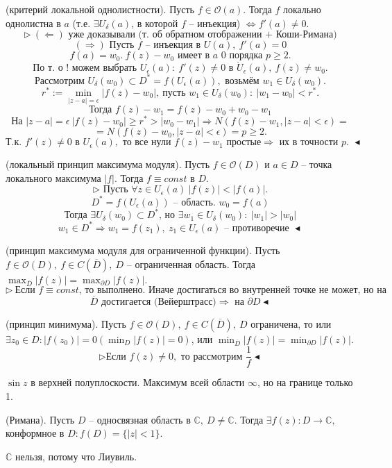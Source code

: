  (критерий локальной однолистности). Пусть $f \in \mathcal{O}(a).$ Тогда $f$ локально однолистна в $a$ (т.е. $\exists U_\delta(a)$, в которой $f$ -- инъекция) $\Leftrightarrow f'(a) \neq 0.$
\[\triangleright \ (\Leftarrow) \text{ уже доказывали (т. об обратном отображении + Коши-Римана)}\]
\[(\Rightarrow) \text{ Пусть $f$ -- инъекция в } U(a), \ f'(a) = 0\]
\[f(a) = w_0. \ f(z) - w_0 \text{ имеет в $a$ 0 порядка $p \geq 2$.}\]
\[\text{По т. о ! можем выбрать } U_\epsilon(a): \ f'(z) \neq 0 \text{ в } \mathring{U}_\epsilon(a), \ f(z) \neq w_0.\]
\[\text{Рассмотрим } U_\delta(w_0) \subset D^* = f(U_\epsilon(a)), \text{ возьмём } w_1 \in U_\delta(w_0).\]
\[r^* := \min_{|z-a|=\epsilon} |f(z) - w_0|, \ \text{пусть } w_1 \in U_\delta(w_0) : \ |w_1-w_0|<r^*.\]
\[\text{Тогда } f(z) - w_1 = f(z) - w_0 + w_0 - w_1\]
\[\text{На } |z-a|=\epsilon \ |f(z) - w_0|\geq r^* > |w_0-w_1| \Rightarrow N(f(z)-w_1, |z-a|<\epsilon) =\] 
\[=N(f(z)-w_0, |z-a|<\epsilon) = p \geq 2.\]
\[\text{Т.к. } f'(z)\neq 0 \text{ в } U_\epsilon(a), \text{ то все нули $f(z) - w_1$ простые} \Rightarrow \text{ их в точности $p$. } \blacktriangleleft\]

 (локальный принцип максимума модуля). Пусть $f \in \mathcal{O}(D)$ и $a \in D$ -- точка локального максимума $|f|$. Тогда $f \equiv const$ в $D$.
\[\triangleright \text{ Пусть } \forall z \in U_\epsilon(a) \ |f(z)|<|f(a)|. \]
\[D^* = f(U_\epsilon(a)) \text{ -- область. } w_0 = f(a)\]
\[\text{Тогда } \exists U_\delta(w_0) \subset D^*\text{, но } \exists w_1 \in U_\delta(w_0) : \ |w_1|>|w_0|\]
\[w_1 \in D^* \Rightarrow w_1 = f(z_1), \ z_1 \in U_\epsilon(a) \text{ -- противоречие } \blacktriangleleft\]

 (принцип максимума модуля для ограниченной функции). Пусть $f \in \mathcal{O}(D), \ f \in C(\overline{D}), \ D$ -- ограниченная область. Тогда $\max_{\overline{D}} |f(z)| = \max_{\partial D} |f(z)|.$
\[\triangleright \ \text{Если $f \equiv const$, то выполнено. Иначе достигаться во внутренней точке не может, но на}\]
\[\overline{D} \text{ достигается (Вейерштрасс)} \Rightarrow \text{ на } \partial D \blacktriangleleft\]

 (принцип минимума). Пусть $f \in \mathcal{O}(D), \ f \in C(\overline{D}), \ D$  ограничена, то или $\exists z_0 \in D: |f(z_0)| = 0 (\min_D |f(z)| = 0)$, или $\min_{\overline{D}} |f(z)|  = \min_{\partial D} |f(z)|.$
\[\triangleright \text{Если } f(z) \neq 0, \text{ то рассмотрим } \frac{1}{f} \blacktriangleleft\]

 $\sin z$ в верхней полуплоскости. Максимум всей области $\infty$, но на границе только 1.

 (Римана). Пусть $D$ -- односвязная область в $\mathbb{C}, \ D \neq \mathbb{C}$. Тогда $\exists f(z) : D \to \mathbb{C},$ конформное в $D: f(D) = \{|z|<1\}$.

$\mathbb{C}$ нельзя, потому что Лиувиль.
